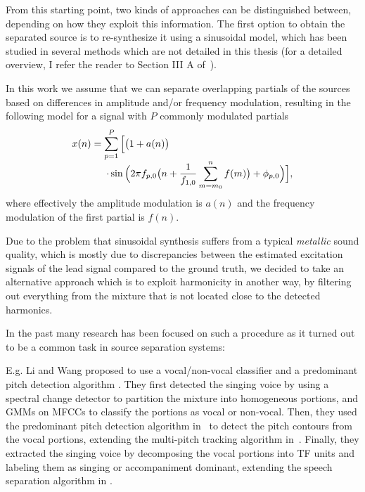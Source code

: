 From this starting point, two kinds of approaches can be distinguished between, depending on how they exploit this information.
The first option to obtain the separated source is to re-synthesize it using a sinusoidal model, which has been studied in several methods which are not detailed in this thesis (for a detailed overview, I refer the reader to Section III A of~\cite{rafii}).

In this work we assume that we can separate overlapping partials of the sources based on differences in amplitude and/or frequency modulation, resulting in the following model for a signal with $P$ commonly modulated partials
\begin{equation}
  \begin{array}{l}
   x(n) = \displaystyle \sum_{p=1}^{P} \Big[\big(1 + a(n)\big) \\
   \hspace{3.5em}\displaystyle \cdot\sin \Big(2\pi f_{p,0}\big(n + \frac{1}{f_{1,0}} \sum_{m=m_0}^{n}{f(m)} \big) + \phi_{p,0} \Big)\Big] ,
  \end{array}
\end{equation}
where effectively the amplitude modulation is $a(n)$ and the frequency modulation of the first partial is $f(n)$.

Due to the problem that sinusoidal synthesis suffers from a typical \textit{metallic} sound quality, which is mostly due to discrepancies between the estimated excitation signals of the lead signal compared to the ground truth, we decided to take an alternative approach which is to exploit harmonicity in another way, by filtering out everything from the mixture that is not located close to the detected harmonics.
\par
In the past many research has been focused on such a procedure as it turned out to be a common task in source separation systems:

E.g. Li and Wang proposed to use a vocal/non-vocal classifier and a predominant pitch detection algorithm \cite{li06, li07}. They first detected the singing voice by using a spectral change detector \cite{duxbury03} to partition the mixture into homogeneous portions, and GMMs on MFCCs to classify the portions as vocal or non-vocal. Then, they used the predominant pitch detection algorithm in~\cite{li05} to detect the pitch contours from the vocal portions, extending the multi-pitch tracking algorithm in~\cite{wu03}. Finally, they extracted the singing voice by decomposing the vocal portions into TF units and labeling them as singing or accompaniment dominant, extending the speech separation algorithm in \cite{hu02}.

